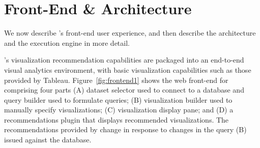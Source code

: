 
\section{{\large \SeeDB} Front-End \& Architecture}
\label{sec:system_architecture}


We now describe \SeeDB's front-end user experience, and then
describe the architecture and the execution engine in more detail.

\SeeDB's visualization recommendation capabilities
are packaged into an end-to-end visual analytics environment, 
with basic visualization capabilities such as those provided by Tableau.
Figure~\ref{fig:frontend1} shows the web front-end for \SeeDB 
comprising four parts 
(A) dataset selector used to connect to a database and query builder used to
formulate queries; 
(B) visualization builder used to manually specify visualizations; 
(C) visualization display pane; and 
(D) a recommendations plugin 
that displays recommended visualizations.
The recommendations provided by \SeeDB change in 
response to changes in the query (B)
issued against the database.

